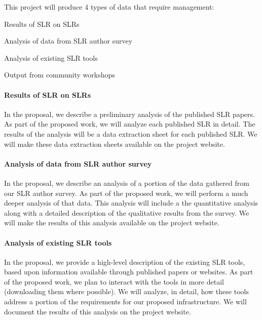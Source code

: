 
This project will produce 4 types of data that require management:
\begin{enumerate*}
	\item{Results of SLR on SLRs}
	\item{Analysis of data from SLR author survey}
	\item{Analysis of existing SLR tools}
	\item{Output from community workshops}
\end{enumerate*}

\paragraph{Results of SLR on SLRs}
In the proposal, we describe a preliminary analysis of the published SLR papers. As part of the proposed work, we will analyze each published SLR in detail. The results of the analysis will be a data extraction sheet for each published SLR. We will make these data extraction sheets available on the project website.

\paragraph{Analysis of data from SLR author survey}
In the proposal, we describe an analysis of a portion of the data gathered from our SLR author survey. As part of the proposed work, we will perform a much deeper analysis of that data. This analysis will include a the quantitative analysis along with a detailed description of the qualitative results from the survey. We will make the results of this analysis available on the project website.

\paragraph{Analysis of existing SLR tools}
In the proposal, we provide a high-level description of the existing SLR tools, based upon information available through published papers or websites. As part of the proposed work, we plan to interact with the tools in more detail (downloading them where possible). We will analyze, in detail, how these tools address a portion of the requirements for our proposed infrastructure. We will document the results of this analysis on the project website. 

